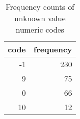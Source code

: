 \begin{table}[H]
\centering
\caption{Frequency counts of unknown value numeric codes}
\label{tab:unknown-freqs}
\begin{tabular}{rr}
\toprule
code & frequency \\
\midrule
-1 & 230 \\
9 & 75 \\
0 & 66 \\
10 & 12 \\
\bottomrule
\end{tabular}
\end{table}
